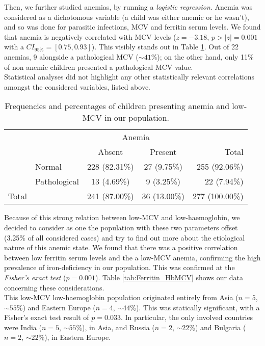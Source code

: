 Then, we further studied anemias, by running a \textit{logistic regression}. Anemia was considered as a dichotomous variable (a child was either anemic or he wasn't), and so was done for parasitic infections, MCV and ferritin serum levels. We found that anemia is negatively correlated with MCV levels ($z=-3.18$, $p>|z|=0.001$ with a $CI_{95\%} =[0.75,0.93]$). This visibly stands out in Table \ref{tab:HbMCV}. Out of 22 anemias, 9 alongside a pathological MCV ($\sim 41\%$); on the other hand, only 11\% of non anemic children presented a pathological MCV value.\\
Statistical analyses did not highlight any other statistically relevant correlations amongst the considered variables, listed above.

\begin{table}[H]
   \centering
   \begin{tabular}{c l c c | r}
   	  & & \multicolumn{2}{c}{Anemia} & \\
   	  \cline{3-4}
       & & Absent & Present & Total\\
      \hline
       \parbox[t]{2mm}{} & Normal & 228 (82.31\%) & 27 (9.75\%) & 255 (92.06\%)\\
       & Pathological & 13 (4.69\%) & 9 (3.25\%) & 22 (7.94\%)\\
      \hline
      Total & & 241 (87.00\%) & 36 (13.00\%) & 277 (100.00\%)\\
   \end{tabular}
   \caption{Frequencies and percentages of children presenting anemia and low-MCV in our population.}
    \label{tab:HbMCV}
\end{table}

Because of this strong relation between low-MCV and low-haemoglobin, we decided to consider as one the population with these two parameters offset (3.25\% of all considered cases) and try to find out more about the etiological nature of this anemic state. We found that there was a positive correlation between low ferritin serum levels and the a low-MCV anemia, confirming the high prevalence of iron-deficiency in our population. This was confirmed at the \textit{Fisher's exact test} ($p=0.001$). Table \ref{tab:Ferritin_HbMCV} shows our data concerning these considerations.\\
This low-MCV low-haemoglobin population originated entirely from Asia ($n=5$, $\sim 55\%$) and Eastern Europe ($n=4$, $\sim 44\%$). This was statically significant, with a Fisher's exact test result of $p=0.033$. In particular, the only involved countries were India ($n=5$, $\sim 55\%$), in Asia, and Russia ($n=2$, $\sim 22\%$) and Bulgaria ($n=2$, $\sim 22\%$), in Eastern Europe.

